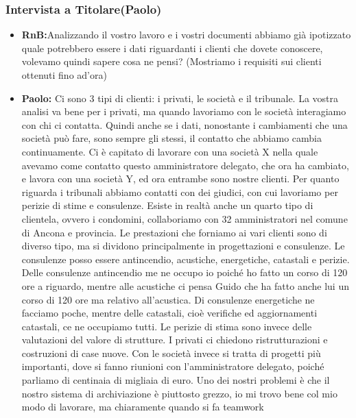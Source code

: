 \documentclass{elegantbook}
\begin{document}
	\subsubsection{Intervista a Titolare(Paolo)}
	\begin{itemize}
		\item \textbf{RnB:}Analizzando il vostro lavoro e i vostri documenti abbiamo già ipotizzato quale potrebbero essere i dati riguardanti i clienti che dovete 
                    conoscere, volevamo quindi sapere cosa ne pensi? (Mostriamo i requisiti sui clienti ottenuti fino ad'ora)
		\item \textbf{Paolo:} Ci sono 3 tipi di clienti: i privati, le società e il tribunale. La vostra analisi va bene per i privati, ma quando lavoriamo con le 
                    società interagiamo con chi ci contatta. Quindi anche se i dati, nonostante i cambiamenti che una società può fare, sono sempre gli stessi, il contatto 
                    che abbiamo cambia continuamente. Ci è capitato di lavorare con una società X nella quale avevamo come contatto questo amministratore delegato, che ora ha
                    cambiato, e lavora con una società Y, ed ora entrambe sono nostre clienti. Per quanto riguarda i tribunali abbiamo contatti con dei giudici, con cui 
                    lavoriamo per perizie di stime e consulenze. Esiste in realtà anche un quarto tipo di clientela, ovvero i condomini, collaboriamo con 32 amministratori 
                    nel comune di Ancona e provincia. Le prestazioni che forniamo ai vari clienti sono di diverso tipo, ma si dividono principalmente in progettazioni e 
                    consulenze. Le consulenze posso essere antincendio, acustiche, energetiche, catastali e perizie. Delle consulenze antincendio me ne occupo io poiché ho 
                    fatto un corso di 120 ore a riguardo, mentre alle acustiche ci pensa Guido che ha fatto anche lui un corso di 120 ore ma relativo all'acustica. Di 
                    consulenze energetiche ne facciamo poche, mentre delle catastali, cioè verifiche ed aggiornamenti catastali, ce ne occupiamo tutti. Le perizie di stima 
                    sono invece delle valutazioni del valore di strutture. I privati ci chiedono ristrutturazioni e costruzioni di case nuove. Con le società invece si 
                    tratta di progetti più importanti, dove si fanno riunioni con l'amministratore delegato, poiché parliamo di centinaia di migliaia di euro. Uno dei nostri 
                    problemi è che il nostro sistema di archiviazione è piuttosto grezzo, io mi trovo bene col mio modo di lavorare, ma chiaramente quando si fa teamwork 

\end{itemize}
\end{document}
